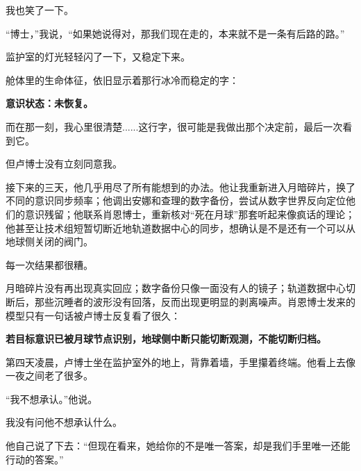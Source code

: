 我也笑了一下。

“博士，”我说，“如果她说得对，那我们现在走的，本来就不是一条有后路的路。”

监护室的灯光轻轻闪了一下，又稳定下来。

舱体里的生命体征，依旧显示着那行冰冷而稳定的字：

\begin{center}
\textbf{意识状态：未恢复。}
\end{center}

而在那一刻，我心里很清楚......这行字，很可能是我做出那个决定前，最后一次看到它。

但卢博士没有立刻同意我。

接下来的三天，他几乎用尽了所有能想到的办法。他让我重新进入月暗碎片，换了不同的意识同步频率；他调出安娜和查理的数字备份，尝试从数字世界反向定位他们的意识残留；他联系肖恩博士，重新核对“死在月球”那套听起来像疯话的理论；他甚至让技术组短暂切断近地轨道数据中心的同步，想确认是不是还有一个可以从地球侧关闭的阀门。

每一次结果都很糟。

月暗碎片没有再出现真实回应；数字备份只像一面没有人的镜子；轨道数据中心切断后，那些沉睡者的波形没有回落，反而出现更明显的剥离噪声。肖恩博士发来的模型只有一句话被卢博士反复看了很久：

\begin{center}
\textbf{若目标意识已被月球节点识别，地球侧中断只能切断观测，不能切断归档。}
\end{center}

第四天凌晨，卢博士坐在监护室外的地上，背靠着墙，手里攥着终端。他看上去像一夜之间老了很多。

“我不想承认。”他说。

我没有问他不想承认什么。

他自己说了下去：“但现在看来，她给你的不是唯一答案，却是我们手里唯一还能行动的答案。”
